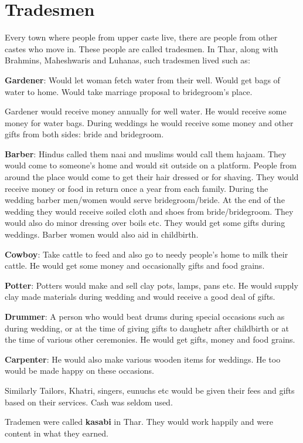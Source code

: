 \chapter{Tradesmen}
Every town where people from upper caste live, there are people from other
castes who move in. These people are called tradesmen. In Thar, along with
Brahmins, Maheshwaris and Luhanas, such tradesmen lived such as:

\textbf{Gardener}: Would let woman fetch water from their well. Would get bags
of water to home. Would take marriage proposal to bridegroom's place.

Gardener would receive money annually for well water. He would receive some
money for water bags. During weddings he would receive some money and other
gifts from both sides: bride and bridegroom.

\textbf{Barber}: Hindus called them naai and muslims would call them hajaam.
They would come to someone's home and would sit outside on a platform. People
from around the place would come to get their hair dressed or for shaving. They
would receive money or food in return once a year from each family. During the
wedding barber men/women would serve bridegroom/bride. At the end of the wedding
they would receive soiled cloth and shoes from bride/bridegroom. They would also do
minor dressing over boils etc. They would get some gifts during weddings.
Barber women would also aid in childbirth.

\textbf{Cowboy}: Take cattle to feed and also go to needy people's home to milk
their cattle. He would get some money and occasionally gifts and food grains.

\textbf{Potter}: Potters would make and sell clay pots, lamps, pans etc. He
would supply clay made materials during wedding and would receive a good deal
of gifts.

\textbf{Drummer}: A person who would beat drums during special occasions such
as during wedding, or at the time of giving gifts to daughetr after childbirth
or at the time of various other ceremonies. He would get gifts, money and food
grains.

\textbf{Carpenter}: He would also make various wooden items for weddings. He
too would be made happy on these occasions.

Similarly Tailors, Khatri, singers, eunuchs etc would be given their fees and
gifts based on their services. Cash was seldom used.

Trademen were called \textbf{kasabi} in Thar. They would work happily and were
content in what they earned.

